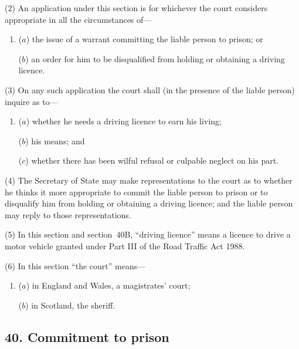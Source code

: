 \documentclass[12pt,a4paper]{article}
\begin{document}
(2) An application under this section is for whichever the court considers appropriate in all the circumstances of—
\begin{enumerate}\item[]
($a$) the issue of a warrant committing the liable person to prison; or

($b$) an order for him to be disqualified from holding or obtaining a driving licence.
\end{enumerate}

(3) On any such application the court shall (in the presence of the liable person) inquire as to—
\begin{enumerate}\item[]
($a$) whether he needs a driving licence to earn his living;

($b$) his means; and

($c$) whether there has been wilful refusal or culpable neglect on his part.
\end{enumerate}

(4) The Secretary of State may make representations to the court as to whether he thinks it more appropriate to commit the liable person to prison or to disqualify him from holding or obtaining a driving licence; and the liable person may reply to those representations.

(5) In this section and section~40B, “driving licence” means a licence to drive a motor vehicle granted under Part III of the Road Traffic Act 1988. 

(6) In this section “the court” means—
\begin{enumerate}\item[]
($a$) in England and Wales, a magistrates' court;

($b$) in Scotland, the sheriff.
\end{enumerate}


\subsection{40. Commitment to prison}

%
%
%
\end{document}
